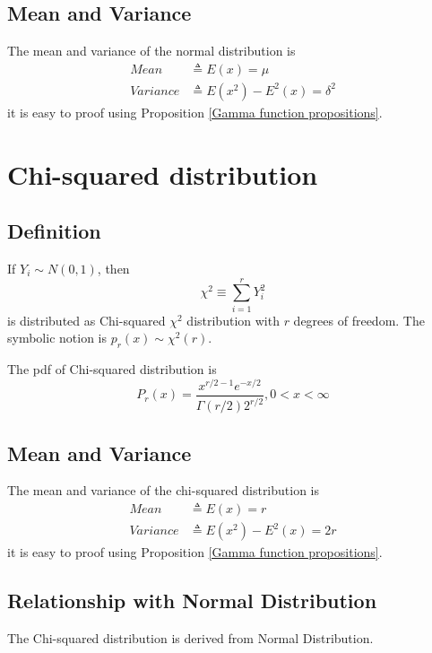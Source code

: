 \documentclass[a4paper]{article}
\begin{document}
\subsection{Mean and Variance}
The mean and variance of the normal distribution is
\begin{equation*}
    \begin{aligned}
        Mean     & \triangleq E(x) = \mu                 \\
        Variance & \triangleq E(x^2) - E^2(x) = \delta^2
    \end{aligned}
\end{equation*}
it is easy to proof using Proposition \ref{Gamma function propositions}.

\section{Chi-squared distribution}

\subsection{Definition}
If $Y_i \sim N(0, 1)$, then
\begin{equation}
    \chi^2 \equiv \sum_{i = 1}^{r} Y_i^2
\end{equation}
is distributed as Chi-squared \emph{$\chi^2$} distribution with $r$ degrees of freedom.
The symbolic notion is $p_r(x) \sim \chi^2(r)$.

The pdf of Chi-squared distribution is
\begin{equation}
    P_r(x) = \frac{x^{r/2-1} e^{-x/2}}{\Gamma(r/2) 2^{r/2}}, 0 < x < \infty
\end{equation}

\subsection{Mean and Variance}
The mean and variance of the chi-squared distribution is
\begin{equation*}
    \begin{aligned}
        Mean     & \triangleq E(x) = r             \\
        Variance & \triangleq E(x^2) - E^2(x) = 2r
    \end{aligned}
\end{equation*}
it is easy to proof using Proposition \ref{Gamma function propositions}.

\subsection{Relationship with Normal Distribution}
The Chi-squared distribution is derived from Normal Distribution.
\end{document}
